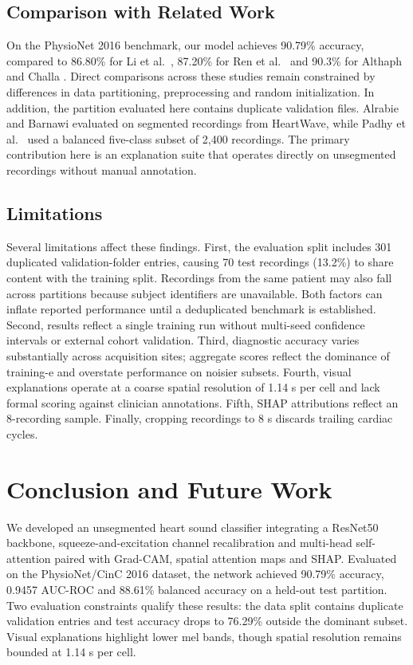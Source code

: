 \documentclass[conference]{IEEEtran}
\begin{document}
\subsection{Comparison with Related Work}
On the PhysioNet 2016 benchmark, our model achieves 90.79\% accuracy, compared to 86.80\% for Li et al.\ \cite{li}, 87.20\% for Ren et al.\ \cite{ren} and 90.3\% for Althaph and Challa \cite{althaph}. Direct comparisons across these studies remain constrained by differences in data partitioning, preprocessing and random initialization. In addition, the partition evaluated here contains duplicate validation files. Alrabie and Barnawi \cite{alrabie} evaluated on segmented recordings from HeartWave, while Padhy et al.\ \cite{padhy} used a balanced five-class subset of 2,400 recordings. The primary contribution here is an explanation suite that operates directly on unsegmented recordings without manual annotation.

\subsection{Limitations}
Several limitations affect these findings. First, the evaluation split includes 301 duplicated validation-folder entries, causing 70 test recordings (13.2\%) to share content with the training split. Recordings from the same patient may also fall across partitions because subject identifiers are unavailable. Both factors can inflate reported performance until a deduplicated benchmark is established. Second, results reflect a single training run without multi-seed confidence intervals or external cohort validation. Third, diagnostic accuracy varies substantially across acquisition sites; aggregate scores reflect the dominance of training-e and overstate performance on noisier subsets. Fourth, visual explanations operate at a coarse spatial resolution of 1.14 s per cell and lack formal scoring against clinician annotations. Fifth, SHAP attributions reflect an 8-recording sample. Finally, cropping recordings to 8 s discards trailing cardiac cycles.

\section{Conclusion and Future Work}
We developed an unsegmented heart sound classifier integrating a ResNet50 backbone, squeeze-and-excitation channel recalibration and multi-head self-attention paired with Grad-CAM, spatial attention maps and SHAP. Evaluated on the PhysioNet/CinC 2016 dataset, the network achieved 90.79\% accuracy, 0.9457 AUC-ROC and 88.61\% balanced accuracy on a held-out test partition. Two evaluation constraints qualify these results: the data split contains duplicate validation entries and test accuracy drops to 76.29\% outside the dominant subset. Visual explanations highlight lower mel bands, though spatial resolution remains bounded at 1.14 s per cell.
\end{document}
